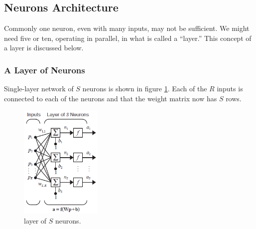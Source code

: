 \documentclass[12pt, a4paper, twoside]{report}
\begin{document}
\subsection{Neurons Architecture}
Commonly one neuron, even with many inputs, may not be sufficient. We might need five or ten, operating in parallel, in what is called a ``layer.'' This concept of a layer is discussed below.

\subsubsection{A Layer of Neurons}
Single-layer network of $S$ neurons is shown in figure \ref{fig:layer_neurons}. Each of the $R$ inputs is connected to each of the neurons and that the weight matrix now has $S$ rows.

\begin{figure}[!h]
	\centering
	\includegraphics[width=0.35\textwidth]
	{images/chapter4/layer_neurons}
	\caption{layer of $S$ neurons.}
	\label{fig:layer_neurons}
\end{figure}
\end{document}
